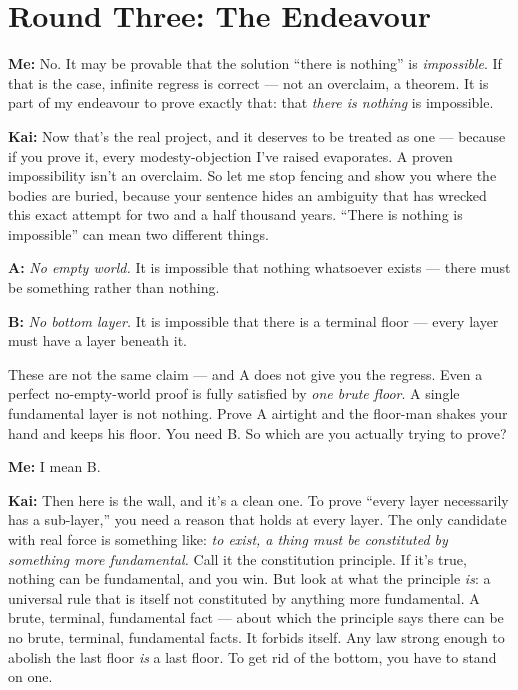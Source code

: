 \documentclass[fontsize=11pt,paper=a4,pagesize=auto,parskip=half-]{scrbook}
\newcommand{\speaker}[1]{\par\noindent\textbf{#1:}\hspace{0.6em}}
\begin{document}
\section{Round Three: The Endeavour}

\speaker{Me} No. It may be provable that the solution ``there is nothing'' is \emph{impossible}. If that is the case, infinite regress is correct --- not an overclaim, a theorem. It is part of my endeavour to prove exactly that: that \emph{there is nothing} is impossible.

\speaker{Kai} Now that's the real project, and it deserves to be treated as one --- because if you prove it, every modesty-objection I've raised evaporates. A proven impossibility isn't an overclaim. So let me stop fencing and show you where the bodies are buried, because your sentence hides an ambiguity that has wrecked this exact attempt for two and a half thousand years. ``There is nothing is impossible'' can mean two different things.

\textbf{A:} \emph{No empty world.} It is impossible that nothing whatsoever exists --- there must be something rather than nothing.

\textbf{B:} \emph{No bottom layer.} It is impossible that there is a terminal floor --- every layer must have a layer beneath it.

These are not the same claim --- and A does not give you the regress. Even a perfect no-empty-world proof is fully satisfied by \emph{one brute floor}. A single fundamental layer is not nothing. Prove A airtight and the floor-man shakes your hand and keeps his floor. You need B. So which are you actually trying to prove?

\speaker{Me} I mean B.

\speaker{Kai} Then here is the wall, and it's a clean one. To prove ``every layer necessarily has a sub-layer,'' you need a reason that holds at every layer. The only candidate with real force is something like: \emph{to exist, a thing must be constituted by something more fundamental.} Call it the constitution principle. If it's true, nothing can be fundamental, and you win. But look at what the principle \emph{is}: a universal rule that is itself not constituted by anything more fundamental. A brute, terminal, fundamental fact --- about which the principle says there can be no brute, terminal, fundamental facts. It forbids itself. Any law strong enough to abolish the last floor \emph{is} a last floor. To get rid of the bottom, you have to stand on one.
\end{document}
